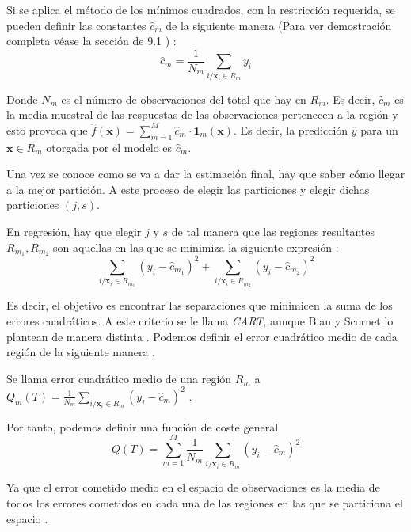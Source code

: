 \noindent Si se aplica el método de los mínimos cuadrados, con la restricción requerida, se pueden definir las constantes $\hat{c}_m$ de la siguiente manera (Para ver demostración completa véase la sección de 9.1 \cite{Breiman 1984}) :
\begin{equation}
\hat{c}_m=\dfrac{1}{N_m}\sum_{i/\mathbf{x}_i\in R_m} y_i
\end{equation}

\noindent Donde $N_m$ es el número de observaciones del total que hay en $R_m$. Es decir, $\hat{c}_m$ es la media muestral de las respuestas de las observaciones pertenecen a la región y esto provoca que $\hat{f}(\mathbf{x})=\sum_{m=1}^M \hat{c}_m \cdot \mathbf{1}_m(\mathbf{x})$. Es decir, la predicción $\hat{y}$ para un $\mathbf{x}\in R_m$ otorgada por el modelo es $\hat{c}_m$. \cite{Hastie 2001, Breiman 1984}

\noindent Una vez se conoce como se va a dar la estimación final, hay que saber cómo llegar a la mejor partición. A este proceso de elegir las particiones y elegir dichas particiones $(j,s)$. 

\noindent En regresión, hay que elegir $j$ y $s$ de tal manera que las regiones resultantes $R_{m_1},R_{m_2}$ son aquellas en las que se minimiza la siguiente expresión \cite{Breiman 1984}:
\begin{equation}
\sum_{i/\mathbf{x}_i\in R_{m_1} } (y_i-\hat{c}_{m_1})^2+\sum_{i/\mathbf{x}_i\in R_{m_2} } (y_i-\hat{c}_{m_2})^2
\end{equation}

\noindent Es decir, el objetivo es encontrar las separaciones que minimicen la suma de los errores cuadráticos. A este criterio se le llama \emph{CART}, aunque Biau y Scornet  lo plantean de manera distinta \cite{Biau 2016, Breiman 1984}. Podemos definir el error cuadrático medio de cada región de la siguiente manera \cite{Hastie 2001}.

\begin{defi}
Se llama error cuadrático medio de una región $R_m$ a $Q_m(T)=\frac{1}{N_m}\sum_{i/\mathbf{x}_i\in R_m}(y_i-\hat{c}_m)^2$ .
\end{defi}

\noindent Por tanto, podemos definir una función de coste general 
\begin{equation}
Q(T)=\sum_{m=1}^M\frac{1}{N_m}\sum_{i/\mathbf{x}_i\in R_m} (y_i-\hat{c}_m)^2
\end{equation}


\noindent Ya que el error cometido medio en el espacio de observaciones es la media de todos los errores cometidos en cada una de las regiones en las que se particiona el espacio \cite{Breiman 1984}. 


